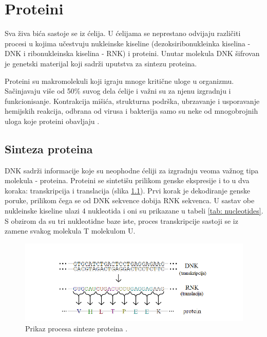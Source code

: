 \chapter{Proteini} %
\label{Chapter2}

Sva živa bića sastoje se iz ćelija. U ćelijama se neprestano odvijaju različiti procesi u kojima učestvuju nukleinske kiseline (dezoksiribonukleinka kiselina - DNK i ribonukleinska kiselina - RNK) i proteini. Unutar molekula DNK šifrovan je genetski materijal koji sadrži uputstva za sintezu proteina. 

Proteini su makromolekuli koji igraju mnoge kritične uloge u organizmu. Sačinjavaju više od 50\% suvog dela ćelije i važni su za njenu izgradnju i funkcionisanje. Kontrakcija mišića, strukturna podrška, ubrzavanje i usporavanje hemijskih reakcija, odbrana od virusa i bakterija samo su neke od mnogobrojnih uloga koje proteini obavljaju \cite{radivojac, doktJK}.


\section{Sinteza proteina}

DNK sadrži informacije koje su neophodne ćeliji za izgradnju veoma važnog tipa molekula - proteina. Proteini se sintetišu prilikom genske ekspresije i to u dva koraka: transkripcija i translacija (slika \ref{fig:synthesis}).  Prvi korak je dekodiranje genske poruke, prilikom čega se od DNK sekvence dobija RNK sekvenca. U sastav obe nukleinske kiseline ulazi 4 nukleotida i oni su prikazane u tabeli \ref{tab: nucleotides}. S obzirom da su tri nukleotidne baze iste, proces transkripcije sastoji se iz zamene svakog molekula T molekulom U. 


\begin{figure}[h]
	\centering
	\includegraphics[width=\textwidth]{Figures/protein_synthesis.png}
	\caption{Prikaz procesa sinteze proteina \cite{doktJK}.}
	\label{fig:synthesis}
\end{figure}


